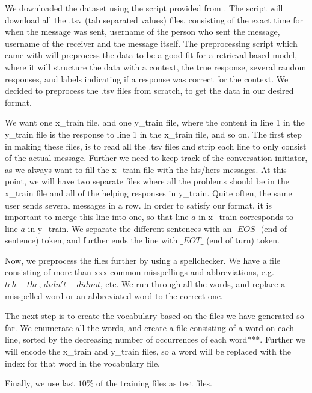 \documentclass{article} %
\begin{document}
We downloaded the dataset using the script provided from \cite{Ubuntuv2}. The script will download all the .tsv (tab separated values) files, consisting of the exact time for when the message was sent, username of the person who sent the message, username of the receiver and the message itself. The preprocessing script which came with \cite{Ubuntuv2} will preprocess the data to be a good fit for a retrieval based model, where it will structure the data with a context, the true response, several random responses, and labels indicating if a response was correct for the context. We decided to preprocess the .tsv files from scratch, to get the data in our desired format.

We want one x\_train file, and one y\_train file, where the content in line 1 in the y\_train file is the response to line 1 in the x\_train file, and so on. The first step in making these files, is to read all the .tsv files and strip each line to only consist of the actual message. Further we need to keep track of the conversation initiator, as we always want to fill the x\_train file with the his/hers messages. At this point, we will have two separate files where all the problems should be in the x\_train file and all of the helping responses in y\_train. Quite often, the same user sends several messages in a row. In order to satisfy our format, it is important to merge this line into one, so that line $a$ in x\_train corresponds to line $a$ in y\_train. We separate the different sentences with an $\_EOS\_$ (end of sentence) token, and further ends the line with $\_EOT\_$ (end of turn) token.

Now, we preprocess the files further by using a spellchecker. We have a file consisting of more than xxx common misspellings and abbreviations, e.g. $teh - the$, $didn't - did not$, etc. We run through all the words, and replace a misspelled word or an abbreviated word to the correct one. 

The next step is to create the vocabulary based on the files we have generated so far. We enumerate all the words, and create a file consisting of a word on each line, sorted by the decreasing number of occurrences of each word***. Further we will encode the x\_train and y\_train files, so a word will be replaced with the index for that word in the vocabulary file. 

Finally, we use last $10\%$ of the training files as test files. 
\end{document}
